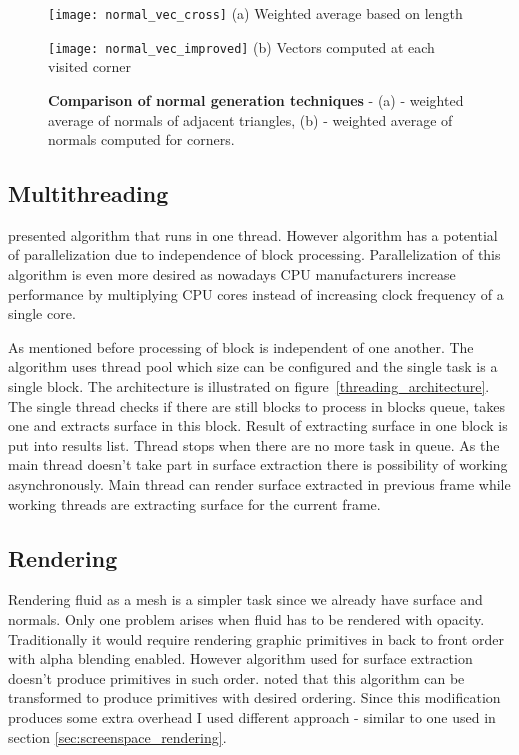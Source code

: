 \begin{figure}[ht]
\begin{minipage}[t]{0.5\linewidth}
\centering
\texttt{[image: normal\_vec\_cross]}
(a) Weighted average based on length
\end{minipage}
\hspace{0.5cm}
\begin{minipage}[t]{0.5\linewidth}
\centering
\texttt{[image: normal\_vec\_improved]}
(b) Vectors computed at each visited corner
\end{minipage}
\caption{\textbf{Comparison of normal generation techniques} - (a) - weighted average of normals of adjacent triangles, (b) - weighted average of normals computed for corners. }
\label{normal_generation}
\end{figure}

\subsection{Multithreading}
\cite{RosenbergBirdwell2008} presented algorithm that runs in one thread. However algorithm has a potential of parallelization due to independence of block processing. Parallelization of this algorithm is even more desired as nowadays CPU manufacturers increase performance by multiplying CPU cores instead of increasing clock frequency of a single core. 

As mentioned before processing of block is independent of one another. The algorithm uses thread pool which size can be configured and the single task is a single block. The architecture is illustrated on figure~\ref{threading_architecture}. The single thread checks if there are still blocks to process in blocks queue, takes one and extracts surface in this block. Result of extracting surface in one block is put into results list. Thread stops when there are no more task in queue. As the main thread doesn't take part in surface extraction there is possibility of working asynchronously. Main thread can render surface extracted in previous frame while working threads are extracting surface for the current frame.


\subsection{Rendering}
Rendering fluid as a mesh is a simpler task since we already have surface and normals. Only one problem arises when fluid has to be rendered with opacity. Traditionally it would require rendering graphic primitives in back to front order with alpha blending enabled. However algorithm used for surface extraction doesn't produce primitives in such order.  \cite{RosenbergBirdwell2008} noted that this algorithm can be transformed to produce primitives with desired ordering. Since this modification produces some extra overhead I used different approach - similar to one used in section \ref{sec:screenspace_rendering}.

